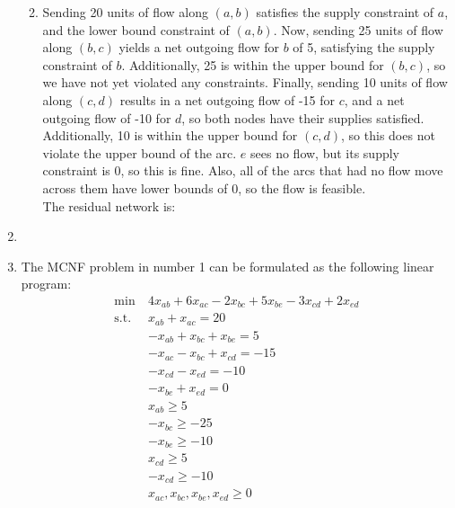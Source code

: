 \documentclass[12pt]{article}
\begin{document}
\begin{enumerate}
\begin{enumerate}
\begin{itemize}
\begin{tabular}{|r|c|c|}
            \end{tabular}
        \end{itemize}
      \item
        Sending 20 units of flow along $(a,b)$ satisfies the supply constraint
        of $a$, and the lower bound constraint of $(a, b)$. Now, sending 25
        units of flow along $(b,c)$ yields a net outgoing flow for $b$ of 5,
        satisfying the supply constraint of $b$. Additionally, 25 is within the
        upper bound for $(b,c)$, so we have not yet violated any constraints.
        Finally, sending 10 units of flow along $(c,d)$ results in a net
        outgoing flow of -15 for $c$, and a net outgoing flow of -10 for $d$,
        so both nodes have their supplies satisfied. Additionally, 10 is within
        the upper bound for $(c,d)$, so this does not violate the upper bound
        of the arc. $e$ sees no flow, but its supply constraint is 0, so this
        is fine. Also, all of the arcs that had no flow move across them have
        lower bounds of 0, so the flow is feasible.\\

        The residual network is:\\
    \end{enumerate}
  \item
  \item
  The MCNF problem in number 1 can be formulated as the following linear program:\\
  \begin{equation}
    \begin{split}
      \text{min}\ &4x_{ab}+6x_{ac}-2x_{bc}+5x_{be}-3x_{cd}+2x_{ed}\\
      \text{s.t.}\ &x_{ab}+x_{ac}=20\\
      &-x_{ab}+x_{bc}+x_{be}=5\\
      &-x_{ac}-x_{bc}+x_{cd}=-15\\
      &-x_{cd}-x_{ed}=-10\\
      &-x_{be}+x_{ed}=0\\
      &x_{ab}\geq5\\
      &-x_{bc}\geq-25\\
      &-x_{be}\geq-10\\
      &x_{cd}\geq5\\
      &-x_{cd}\geq-10\\
      &x_{ac},x_{bc},x_{be},x_{ed}\geq0\\
    \end{split}
  \end{equation}


\end{enumerate}
\end{document}
